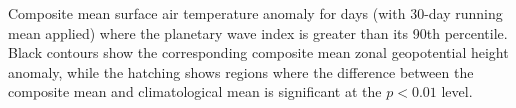 \label{fig:tas_composite}
Composite mean surface air temperature anomaly for days (with 30-day running mean applied) where the planetary wave index is greater than its 90th percentile. Black contours show the corresponding composite mean zonal geopotential height anomaly, while the hatching shows regions where the difference between the composite mean and climatological mean is significant at the $p < 0.01$ level.  

